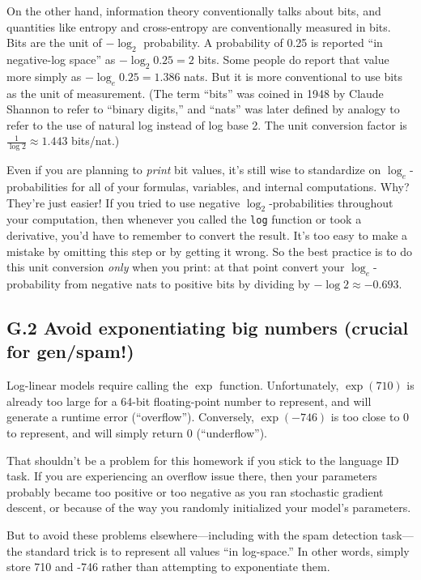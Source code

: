 \documentclass[12pt]{article}
\theoremstyle{plain}
\theoremstyle{definition}
\theoremstyle{remark}
\begin{document}
On the other hand, information theory conventionally talks about bits, and quantities like entropy and cross-entropy are conventionally measured in bits. Bits are the unit of $-\log_2$ probability. A probability of 0.25 is reported “in negative-log space” as $-\log_2 0.25 = 2$ bits. Some people do report that value more simply as $-\log_e 0.25 = 1.386$ nats. But it is more conventional to use bits as the unit of measurement. (The term “bits” was coined in 1948 by Claude Shannon to refer to “binary digits,” and “nats” was later defined by analogy to refer to the use of natural log instead of log base 2. The unit conversion factor is $\frac{1}{\log 2} \approx 1.443$ bits/nat.)  

Even if you are planning to \textit{print} bit values, it’s still wise to standardize on $\log_e$-probabilities for all of your formulas, variables, and internal computations. Why? They’re just easier! If you tried to use negative $\log_2$-probabilities throughout your computation, then whenever you called the \texttt{log} function or took a derivative, you’d have to remember to convert the result. It’s too easy to make a mistake by omitting this step or by getting it wrong. So the best practice is to do this unit conversion \textit{only} when you print: at that point convert your $\log_e$-probability from negative nats to positive bits by dividing by $-\log 2 \approx -0.693$.

\subsection*{G.2 Avoid exponentiating big numbers (crucial for gen/spam!)}
Log-linear models require calling the $\exp$ function. Unfortunately, $\exp(710)$ is already too large for a 64-bit floating-point number to represent, and will generate a runtime error (“overflow”). Conversely, $\exp(-746)$ is too close to 0 to represent, and will simply return 0 (“underflow”).  

That shouldn’t be a problem for this homework if you stick to the language ID task. If you are experiencing an overflow issue there, then your parameters probably became too positive or too negative as you ran stochastic gradient descent, or because of the way you randomly initialized your model’s parameters.  

But to avoid these problems elsewhere—including with the spam detection task—the standard trick is to represent all values “in log-space.” In other words, simply store 710 and -746 rather than attempting to exponentiate them.
\end{document}
